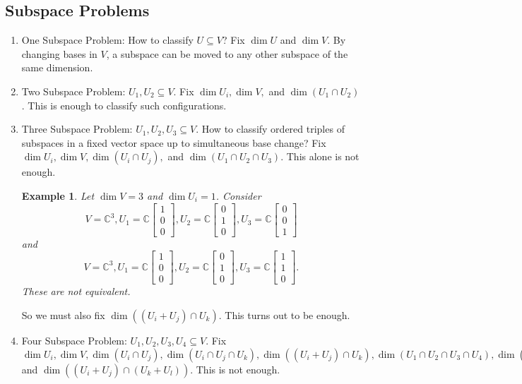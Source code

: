 \documentclass{book}
\newtheorem{example}{Example}[section]
\begin{document}
  	\subsection{Subspace Problems}
		\begin{enumerate}
			\item One Subspace Problem: How to classify $U \subseteq V$? Fix $\dim U$ and $\dim V$. By changing bases in $V$, a subspace can be moved to any other subspace of the same dimension.
			\item Two Subspace Problem:  $U_1,U_2 \subseteq V$. Fix $\dim U_i, \dim V,$ and $\dim (U_1\cap U_2)$. This is enough to classify such configurations.
			\item Three Subspace Problem: $U_1,U_2,U_3 \subseteq V$. How to classify ordered triples of subspaces in a fixed vector space up to simultaneous base change?  Fix $\dim U_i, \dim V, \dim (U_i\cap U_j),$ and $\dim (U_1\cap U_2\cap U_3)$. This alone is not enough.
				\begin{example}
					Let $\dim V=3$ and $\dim U_i=1$. Consider \[V=\mathbb{C}^3, U_1 = \mathbb{C} \begin{bmatrix}1\\0\\0\end{bmatrix},U_2 = \mathbb{C} \begin{bmatrix}0\\1\\0\end{bmatrix},U_3 = \mathbb{C} \begin{bmatrix}0\\0\\1\end{bmatrix}\] and  \[V=\mathbb{C}^3, U_1 = \mathbb{C} \begin{bmatrix}1\\0\\0\end{bmatrix},U_2 = \mathbb{C} \begin{bmatrix}0\\1\\0\end{bmatrix},U_3 = \mathbb{C} \begin{bmatrix}1\\1\\0\end{bmatrix}.\] These are not equivalent.
				\end{example}
			So we must also fix $\dim ((U_i + U_j)\cap U_k)$. This turns out to be enough.
      			\item Four Subspace Problem: $U_1,U_2,U_3, U_4 \subseteq V$. Fix $\dim U_i, \dim V, \dim (U_i\cap U_j),\dim (U_i\cap U_j\cap U_k), \dim ((U_i + U_j)\cap U_k),\dim (U_1\cap U_2 \cap U_3 \cap U_4),  \dim ((U_i + U_j+U_k)\cap U_l),$ and $ \dim ((U_i+ U_j)\cap (U_k+U_l)).$ This is not enough.

\end{enumerate}
\end{document}
